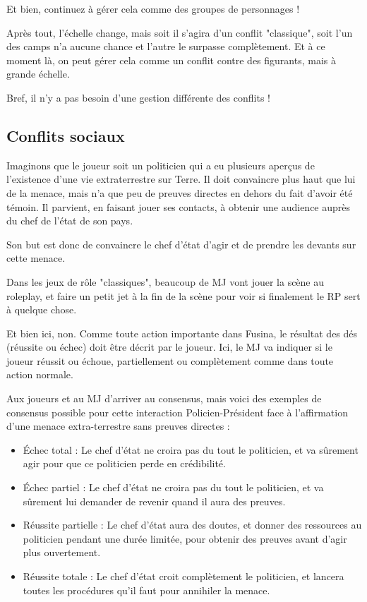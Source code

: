 {
    Et bien, continuez à gérer cela comme des groupes de personnages !
    
    Après tout, l'échelle change, mais soit il s'agira d'un conflit "classique", soit l'un des camps n'a aucune chance et l'autre le surpasse complètement. Et à ce moment là, on peut gérer cela comme un conflit contre des figurants, mais à grande échelle. 
    
    Bref, il n'y a pas besoin d'une gestion différente des conflits !
}

\begin{multicols}{2}

\section{Conflits sociaux}

Imaginons que le joueur soit un politicien qui a eu plusieurs aperçus de l'existence d'une vie extraterrestre sur Terre. Il doit convaincre plus haut que lui de la menace, mais n'a que peu de preuves directes en dehors du fait d'avoir été témoin. Il parvient, en faisant jouer ses contacts, à obtenir une audience auprès du chef de l'état de son pays.

Son but est donc de convaincre le chef d'état d'agir et de prendre les devants sur cette menace. 

Dans les jeux de rôle "classiques", beaucoup de MJ vont jouer la scène au roleplay, et faire un petit jet à la fin de la scène pour voir si finalement le RP sert à quelque chose.

Et bien ici, non. Comme toute action importante dans Fusina, le résultat des dés (réussite ou échec) doit être décrit par le joueur. Ici, le MJ va indiquer si le joueur réussit ou échoue, partiellement ou complètement comme dans toute action normale.

Aux joueurs et au MJ d'arriver au consensus, mais voici des exemples de consensus possible pour cette interaction Policien-Président face à l'affirmation d'une menace extra-terrestre sans preuves directes :

\begin{itemize}
\item Échec total : Le chef d'état ne croira pas du tout le politicien, et va sûrement agir pour que ce politicien perde en crédibilité.
\item Échec partiel : Le chef d'état ne croira pas du tout le politicien, et va sûrement lui demander de revenir quand il aura des preuves.
\item Réussite partielle : Le chef d'état aura des doutes, et donner des ressources au politicien pendant une durée limitée, pour obtenir des preuves avant d'agir plus ouvertement.
\item Réussite totale : Le chef d'état croit complètement le politicien, et lancera toutes les procédures qu'il faut pour annihiler la menace.
\end{itemize}


\end{multicols}
